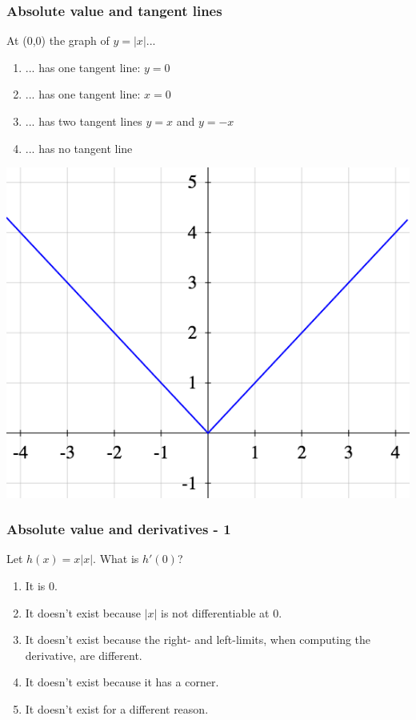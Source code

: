 \documentclass[14pt]{beamer}
\begin{document}
\begin{frame}[t]
	\frametitle{Absolute value and tangent lines}

	At (0,0) the graph of $\displaystyle y=|x|$...
	\begin{enumerate}
		\item ... has one tangent line: $y=0$

		\item ... has one tangent line: $x=0$

		\item ... has two tangent lines $y=x$ and $y=-x$

		\item ... has no tangent line
	\end{enumerate}

	\begin{center}
		\includegraphics[scale=.25]{G8}
	\end{center}
\end{frame}

\begin{frame}[t]
	\frametitle{Absolute value and derivatives - 1}

	Let $h(x) = x|x|$. What is $h'(0)$?

	\begin{enumerate}
		\item It is 0.

		\item It doesn't exist because $|x|$ is not differentiable at $0$.

		\item It doesn't exist because the right- and left-limits, when computing the
			derivative, are different.

		\item It doesn't exist because it has a corner.

		\item It doesn't exist for a different reason.
	\end{enumerate}
\end{frame}
\end{document}
